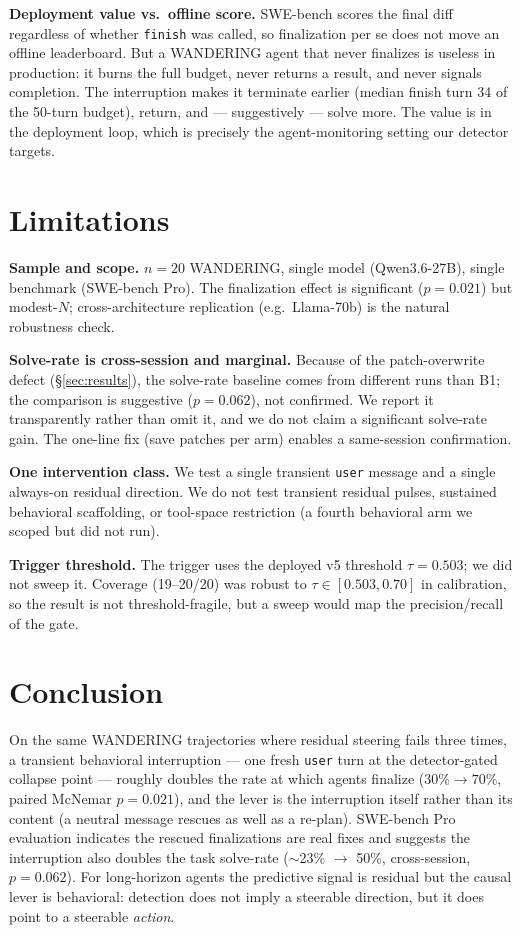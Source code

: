 \documentclass[11pt]{article}
\begin{document}
\textbf{Deployment value vs.\ offline score.} SWE-bench scores the final diff regardless of whether \texttt{finish} was called, so finalization per se does not move an offline leaderboard. But a WANDERING agent that never finalizes is useless in production: it burns the full budget, never returns a result, and never signals completion. The interruption makes it terminate earlier (median finish turn 34 of the 50-turn budget), return, and --- suggestively --- solve more. The value is in the deployment loop, which is precisely the agent-monitoring setting our detector targets.

\section{Limitations}\label{sec:limitations}

\textbf{Sample and scope.} $n=20$ WANDERING, single model (Qwen3.6-27B), single benchmark (SWE-bench Pro). The finalization effect is significant ($p=0.021$) but modest-$N$; cross-architecture replication (e.g.\ Llama-70b) is the natural robustness check.

\textbf{Solve-rate is cross-session and marginal.} Because of the patch-overwrite defect (\S\ref{sec:results}), the solve-rate baseline comes from different runs than B1; the comparison is suggestive ($p=0.062$), not confirmed. We report it transparently rather than omit it, and we do not claim a significant solve-rate gain. The one-line fix (save patches per arm) enables a same-session confirmation.

\textbf{One intervention class.} We test a single transient \texttt{user} message and a single always-on residual direction. We do not test transient residual pulses, sustained behavioral scaffolding, or tool-space restriction (a fourth behavioral arm we scoped but did not run).

\textbf{Trigger threshold.} The trigger uses the deployed v5 threshold $\tau=0.503$; we did not sweep it. Coverage (19--20/20) was robust to $\tau \in [0.503, 0.70]$ in calibration, so the result is not threshold-fragile, but a sweep would map the precision/recall of the gate.

\section{Conclusion}\label{sec:conclusion}

On the same WANDERING trajectories where residual steering fails three times, a transient behavioral interruption --- one fresh \texttt{user} turn at the detector-gated collapse point --- roughly doubles the rate at which agents finalize ($30\% \to 70\%$, paired McNemar $p=0.021$), and the lever is the interruption itself rather than its content (a neutral message rescues as well as a re-plan). SWE-bench Pro evaluation indicates the rescued finalizations are real fixes and suggests the interruption also doubles the task solve-rate ($\sim$23\% $\to$ 50\%, cross-session, $p=0.062$). For long-horizon agents the predictive signal is residual but the causal lever is behavioral: detection does not imply a steerable direction, but it does point to a steerable \emph{action}.
\end{document}
